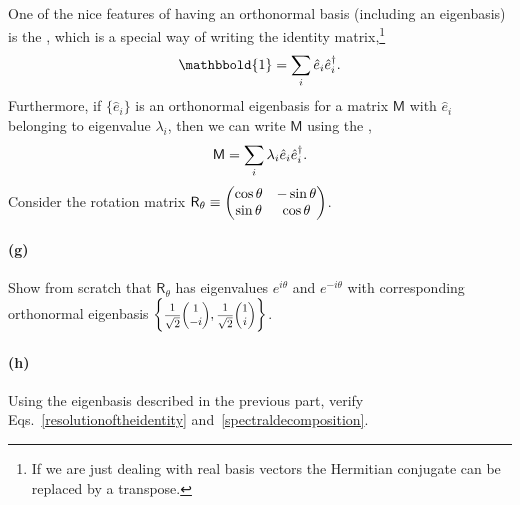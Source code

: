\documentclass{article}
\begin{document}
\paragraph{}
One of the nice features of having an orthonormal basis (including an eigenbasis) is the , which is a special way of writing the identity 
matrix,\footnote{If we are just dealing with real basis vectors the Hermitian conjugate can be replaced by a transpose.}
	\begin{equation}
		\mathbbold{1} = \sum_{i} \hat{e}_{i}\hat{e}_{i}^{\t}.
	\label{resolutionoftheidentity}
	\end{equation}
Furthermore, if $\{\hat{e}_{i}\}$ is an orthonormal eigenbasis for a matrix $\mathsf{M}$ with $\hat{e}_{i}$ belonging to eigenvalue $\lambda_{i}$, 
then we can write $\mathsf{M}$ using the ,
	\begin{equation}
		\mathsf{M} = \sum_{i} \lambda_{i}\hat{e}_{i}\hat{e}_{i}^{\dagger}.
	\label{spectraldecomposition}
	\end{equation}
Consider the rotation matrix $\mathsf{R}_{\theta} \equiv \smmatrix{1}{\cos\theta & -\sin\theta \\ \sin\theta & \cos\theta}$.


\paragraph{(g)}		\extrapart
Show from scratch that $\mathsf{R}_{\theta}$ has eigenvalues $e^{i\theta}$ and $e^{-i\theta}$ with
corresponding orthonormal eigenbasis $\left\{\sqrtfinv{2}\smtwovect{1}{-i},\sqrtfinv{2}\smtwovect{1}{i}\right\}$.


\paragraph{(h)}
Using the eigenbasis described in the previous part, verify Eqs.~\ref{resolutionoftheidentity} and~\ref{spectraldecomposition}.
\end{document}

